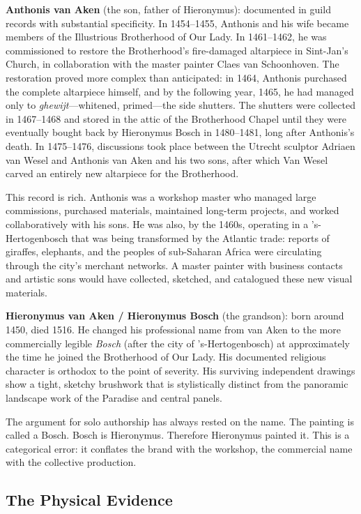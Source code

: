 \textbf{Anthonis van Aken} (the son, father of Hieronymus): documented in
guild records with substantial specificity.  In 1454--1455, Anthonis and
his wife became members of the Illustrious Brotherhood of Our Lady.  In
1461--1462, he was commissioned to restore the Brotherhood's
fire-damaged altarpiece in Sint-Jan's Church, in collaboration with the
master painter Claes van Schoonhoven.  The restoration proved more complex
than anticipated: in 1464, Anthonis purchased the complete altarpiece
himself, and by the following year, 1465, he had managed only to
\textit{ghewijt}---whitened, primed---the side shutters.  The shutters were
collected in 1467--1468 and stored in the attic of the Brotherhood Chapel
until they were eventually bought back by Hieronymus Bosch in 1480--1481,
long after Anthonis's death.  In 1475--1476, discussions took place between
the Utrecht sculptor Adriaen van Wesel and Anthonis van Aken and his two
sons, after which Van Wesel carved an entirely new altarpiece for the
Brotherhood.

This record is rich.  Anthonis was a workshop master who managed
large commissions, purchased materials, maintained long-term projects, and
worked collaboratively with his sons.  He was also, by the 1460s, operating
in a 's-Hertogenbosch that was being transformed by the Atlantic trade:
reports of giraffes, elephants, and the peoples of sub-Saharan Africa were
circulating through the city's merchant networks.  A master painter with
business contacts and artistic sons would have collected, sketched, and
catalogued these new visual materials.

\textbf{Hieronymus van Aken / Hieronymus Bosch} (the grandson): born around
1450, died 1516.  He changed his professional name from van Aken to the
more commercially legible \textit{Bosch} (after the city of
's-Hertogenbosch) at approximately the time he joined the Brotherhood of
Our Lady.  His documented religious character is orthodox to the point of
severity.  His surviving independent drawings show a tight, sketchy
brushwork that is stylistically distinct from the panoramic landscape work
of the Paradise and central panels.

The argument for solo authorship has always rested on the name.  The
painting is called a Bosch.  Bosch is Hieronymus.  Therefore Hieronymus
painted it.  This is a categorical error: it conflates the brand with the
workshop, the commercial name with the collective production.

\bigskip

\subsection*{The Physical Evidence}

